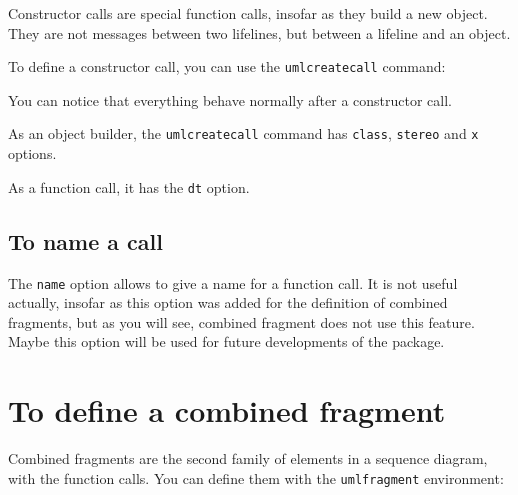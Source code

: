 \documentclass[a4paper,11pt]{report}
\begin{document}
Constructor calls are special function calls, insofar as they build a new object. They are not messages between two lifelines, but between a lifeline and an object.

To define a constructor call, you can use the {\tt umlcreatecall} command:

\medskip

\begin{minipage}{0.5\textwidth}
	
\end{minipage}
\begin{minipage}{0.5\textwidth}
	\begin{center}
	\end{center}
\end{minipage}

\medskip

You can notice that everything behave normally after a constructor call.

\medskip

As an object builder, the {\tt umlcreatecall} command has {\tt class}, {\tt stereo} and {\tt x} options.

As a function call, it has the {\tt dt} option.

\subsection{To name a call}\label{ss.callname}

The {\tt name} option allows to give a name for a function call. It is not useful actually, insofar as this option was added for the definition of combined fragments, but as you will see, combined fragment does not use this feature. Maybe this option will be used for future developments of the package.

\section{To define a combined fragment}\label{s.fragments}

Combined fragments are the second family of elements in a sequence diagram, with the function calls. You can define them with the {\tt umlfragment} environment:

\medskip

\begin{minipage}{0.5\textwidth}
	
\end{minipage}
\begin{minipage}{0.5\textwidth}
	\begin{center}
	\end{center}
\end{minipage}
\end{document}
